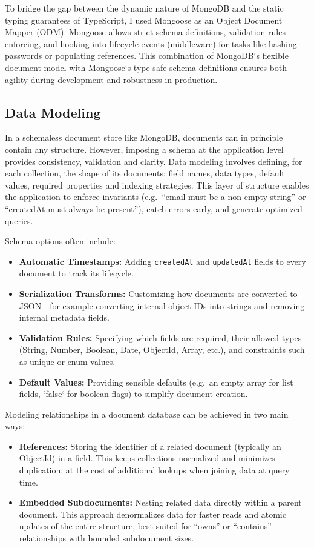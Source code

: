 To bridge the gap between the dynamic nature of MongoDB and the static typing guarantees of TypeScript, I used Mongoose as an Object Document Mapper (ODM).  Mongoose allows strict schema definitions, validation rules enforcing, and hooking into lifecycle events (middleware) for tasks like hashing passwords or populating references.  This combination of MongoDB`s flexible document model with Mongoose`s type-safe schema definitions ensures both agility during development and robustness in production.

\subsection{Data Modeling}

In a schemaless document store like MongoDB, documents can in principle contain any structure.  However, imposing a schema at the application level provides consistency, validation and clarity.  Data modeling involves defining, for each collection, the shape of its documents: field names, data types, default values, required properties and indexing strategies.  This layer of structure enables the application to enforce invariants (e.g.\ “email must be a non-empty string” or “createdAt must always be present”), catch errors early, and generate optimized queries.

Schema options often include:
\begin{itemize}
  \item \textbf{Automatic Timestamps:}  Adding \texttt{createdAt} and \texttt{updatedAt} fields to every document to track its lifecycle.
  \item \textbf{Serialization Transforms:}  Customizing how documents are converted to JSON—for example converting internal object IDs into strings and removing internal metadata fields.
  \item \textbf{Validation Rules:}  Specifying which fields are required, their allowed types (String, Number, Boolean, Date, ObjectId, Array, etc.), and constraints such as unique or enum values.
  \item \textbf{Default Values:}  Providing sensible defaults (e.g.\ an empty array for list fields, `false` for boolean flags) to simplify document creation.
\end{itemize}

Modeling relationships in a document database can be achieved in two main ways:
\begin{itemize}
  \item \textbf{References:}  Storing the identifier of a related document (typically an ObjectId) in a field.  This keeps collections normalized and minimizes duplication, at the cost of additional lookups when joining data at query time.
  \item \textbf{Embedded Subdocuments:}  Nesting related data directly within a parent document.  This approach denormalizes data for faster reads and atomic updates of the entire structure, best suited for “owns” or “contains” relationships with bounded subdocument sizes.
\end{itemize}


